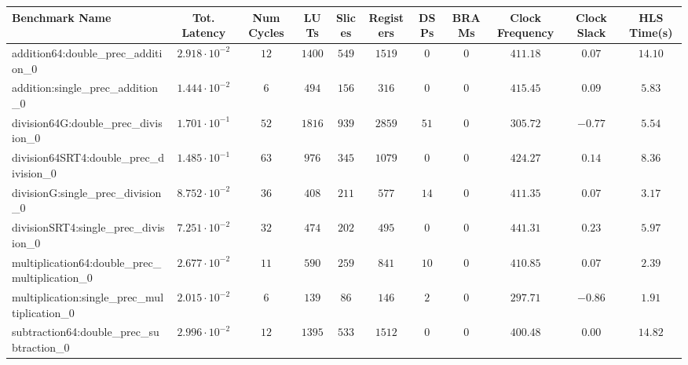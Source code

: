 \begin{tabular}{|l|c|c|c|c|c|c|c|c|c|c|}
\hline
Benchmark Name                                   & Tot. Latency            & Num Cycles & LUTs     & Slices   & Registers & DSPs   & BRAMs & Clock Frequency & Clock Slack & HLS Time(s) \\
\hline
addition64:double\_prec\_addition\_0             & $ 2.918 \cdot 10^{-2} $ & $ 12     $ & $ 1400 $ & $ 549  $ & $ 1519  $ & $ 0  $ & $ 0 $ & $ 411.18      $ & $ 0.07    $ & $ 14.10   $ \\
addition:single\_prec\_addition\_0               & $ 1.444 \cdot 10^{-2} $ & $ 6      $ & $ 494  $ & $ 156  $ & $ 316   $ & $ 0  $ & $ 0 $ & $ 415.45      $ & $ 0.09    $ & $ 5.83    $ \\
division64G:double\_prec\_division\_0            & $ 1.701 \cdot 10^{-1} $ & $ 52     $ & $ 1816 $ & $ 939  $ & $ 2859  $ & $ 51 $ & $ 0 $ & $ 305.72      $ & $ -0.77   $ & $ 5.54    $ \\
division64SRT4:double\_prec\_division\_0         & $ 1.485 \cdot 10^{-1} $ & $ 63     $ & $ 976  $ & $ 345  $ & $ 1079  $ & $ 0  $ & $ 0 $ & $ 424.27      $ & $ 0.14    $ & $ 8.36    $ \\
divisionG:single\_prec\_division\_0              & $ 8.752 \cdot 10^{-2} $ & $ 36     $ & $ 408  $ & $ 211  $ & $ 577   $ & $ 14 $ & $ 0 $ & $ 411.35      $ & $ 0.07    $ & $ 3.17    $ \\
divisionSRT4:single\_prec\_division\_0           & $ 7.251 \cdot 10^{-2} $ & $ 32     $ & $ 474  $ & $ 202  $ & $ 495   $ & $ 0  $ & $ 0 $ & $ 441.31      $ & $ 0.23    $ & $ 5.97    $ \\
multiplication64:double\_prec\_multiplication\_0 & $ 2.677 \cdot 10^{-2} $ & $ 11     $ & $ 590  $ & $ 259  $ & $ 841   $ & $ 10 $ & $ 0 $ & $ 410.85      $ & $ 0.07    $ & $ 2.39    $ \\
multiplication:single\_prec\_multiplication\_0   & $ 2.015 \cdot 10^{-2} $ & $ 6      $ & $ 139  $ & $ 86   $ & $ 146   $ & $ 2  $ & $ 0 $ & $ 297.71      $ & $ -0.86   $ & $ 1.91    $ \\
subtraction64:double\_prec\_subtraction\_0       & $ 2.996 \cdot 10^{-2} $ & $ 12     $ & $ 1395 $ & $ 533  $ & $ 1512  $ & $ 0  $ & $ 0 $ & $ 400.48      $ & $ 0.00    $ & $ 14.82   $ \\

\end{tabular}

